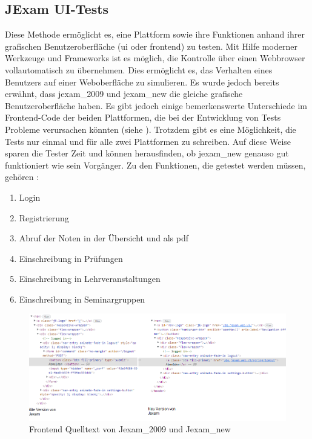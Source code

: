 \subsection{JExam UI-Tests}

Diese Methode erm\"oglicht es, eine Plattform sowie ihre Funktionen anhand
ihrer grafischen Benutzeroberfl\"ache (\acs{ui} oder \Gls{frontend}) zu
testen. Mit Hilfe moderner Werkzeuge und Frameworks ist es m\"oglich, die
Kontrolle \"uber einen Webbrowser vollautomatisch zu \"ubernehmen. Dies
erm\"oglicht es, das Verhalten eines Benutzers auf einer Weboberfl\"ache zu
simulieren. Es wurde jedoch bereits erw\"ahnt, dass \Gls{jexam_2009} und \Gls{jexam_new}
die gleiche grafische Benutzeroberfl\"ache haben. Es gibt jedoch einige
bemerkenswerte Unterschiede im Frontend-Code der beiden Plattformen,
die bei der Entwicklung von Tests Probleme verursachen k\"onnten
(siehe ). Trotzdem gibt es eine
M\"oglichkeit, die Tests nur einmal und f\"ur alle zwei
Plattformen zu schreiben. Auf diese Weise sparen die Tester Zeit und k\"onnen
herausfinden, ob \Gls{jexam_new} genauso gut funktioniert wie sein Vorg\"anger. Zu den Funktionen, die getestet werden müssen, gehören :
\begin{enumerate}
    \item Login
    \item Registrierung
    \item Abruf der Noten in der Übersicht und als pdf
    \item Einschreibung in Prüfungen
    \item Einschreibung in Lehrveranstaltungen
    \item Einschreibung in Seminargruppen
\end{enumerate}

\noindent
\begin{figure}
    \centering
    \includegraphics[scale=0.6]{images/jexam_compare}
    \caption{Frontend Quelltext von Jexam\_2009 und Jexam\_new} \label{fig:old_new}
\end{figure}

